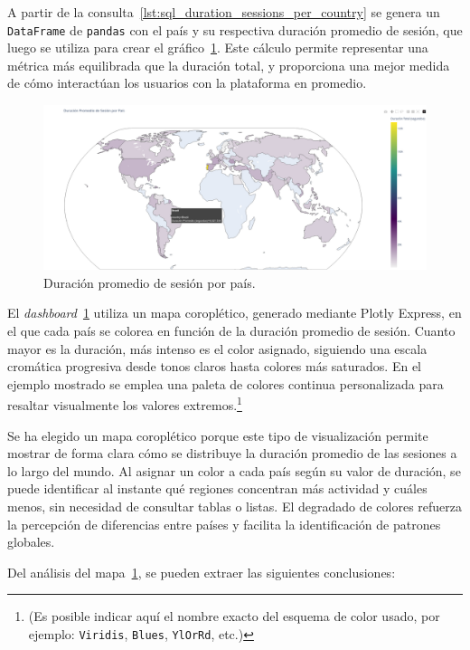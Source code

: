 \documentclass[a4paper, 12pt]{book}
\begin{document}
A partir de la consulta~\ref{lst:sql_duration_sessions_per_country} se genera un \texttt{DataFrame} de \texttt{pandas} con el país y su respectiva duración promedio de sesión, que luego se utiliza para crear el gráfico~\ref{fig:1c}. Este cálculo permite representar una métrica más equilibrada que la duración total, y proporciona una mejor medida de cómo interactúan los usuarios con la plataforma en promedio.

\begin{figure}[H]
  \centering
  \includegraphics[width=1.1\textwidth]{img/1c.png}
  \caption{Duración promedio de sesión por país.}
  \label{fig:1c}
\end{figure}

El \textit{dashboard}~\ref{fig:1c} utiliza un mapa coroplético, generado mediante Plotly Express, en el que cada país se colorea en función de la duración promedio de sesión. Cuanto mayor es la duración, más intenso es el color asignado, siguiendo una escala cromática progresiva desde tonos claros hasta colores más saturados. En el ejemplo mostrado se emplea una paleta de colores continua personalizada para resaltar visualmente los valores extremos.\footnote{(Es posible indicar aquí el nombre exacto del esquema de color usado, por ejemplo: \texttt{Viridis}, \texttt{Blues}, \texttt{YlOrRd}, etc.)}

Se ha elegido un mapa coroplético porque este tipo de visualización permite mostrar de forma clara cómo se distribuye la duración promedio de las sesiones a lo largo del mundo. Al asignar un color a cada país según su valor de duración, se puede identificar al instante qué regiones concentran más actividad y cuáles menos, sin necesidad de consultar tablas o listas. El degradado de colores refuerza la percepción de diferencias entre países y facilita la identificación de patrones globales.

Del análisis del mapa~\ref{fig:1c}, se pueden extraer las siguientes conclusiones:
\end{document}
